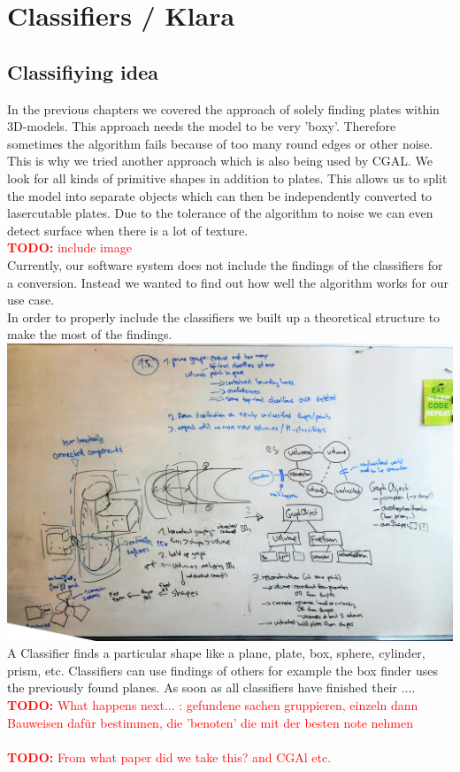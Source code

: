 \documentclass[../ClassicThesis.tex]{subfiles}
\begin{document}
\chapter{Classifiers / Klara}\label{ch:classifiers}
\newcommand{\TODO}[1]{\textcolor{red}{\\ \textbf{TODO:} #1 \\}}

\section{Classifiying idea}
In the previous chapters we covered the approach of solely finding plates within 3D-models. This approach needs the model to be very 'boxy'. Therefore sometimes the algorithm fails because of too many round edges or other noise. \\
This is why we tried another approach which is also being used by CGAL. We look for all kinds of primitive shapes in addition to plates. This allows us to split the model into separate objects which can then be independently converted to lasercutable plates. Due to the tolerance of the algorithm to noise we can even detect surface when there is a lot of texture. \TODO{include image}
Currently, our software system does not include the findings of the classifiers for a conversion. Instead we wanted to find out how well the algorithm works for our use case. \\
In order to properly include the classifiers we built up a theoretical structure to make the most of the findings. \\
\includegraphics[width=0.5\columnwidth]{Images/10-classifiers-ClassificationStructureGraphBuilding.jpg}\\
A Classifier finds a particular shape like a plane, plate, box, sphere, cylinder, prism, etc. Classifiers can use findings of others for example the box finder uses the previously found planes. As soon as all classifiers have finished their .... \TODO{What happens next... : gefundene sachen gruppieren, einzeln dann Bauweisen dafür bestimmen, die 'benoten' die mit der besten note nehmen} 
\TODO{From what paper did we take this? and CGAl etc.}
\end{document}
